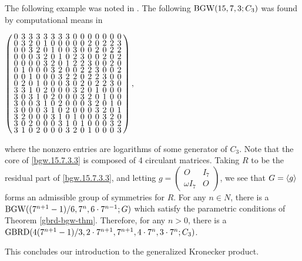 \documentclass[../../../main]{subfiles}
\begin{document}
\begin{ex}
 The following example was noted in \cite{pender_2020}. The following $\text{BGW}(15,7,3;C_3)$ was found by computational means in \cite{mathon-signings}
 \begin{defenum}
  \item\label{bgw.15.7.3.3} $
  \arraycolsep=2.0pt\def\arraystretch{0.5}
  \left(\begin{array}{ccccccccccccccc}
0&3&3&3&3&3&3&3&0&0&0&0&0&0&0\\
0&3&2&0&1&0&0&0&0&0&2&0&2&2&3\\
0&0&3&2&0&1&0&0&3&0&0&2&0&2&2\\
0&0&0&3&2&0&1&0&2&3&0&0&2&0&2\\
0&0&0&0&3&2&0&1&2&2&3&0&0&2&0\\
0&1&0&0&0&3&2&0&0&2&2&3&0&0&2\\
0&0&1&0&0&0&3&2&2&0&2&2&3&0&0\\
0&2&0&1&0&0&0&3&0&2&0&2&2&3&0\\
3&3&1&0&2&0&0&0&3&2&0&1&0&0&0\\
3&0&3&1&0&2&0&0&0&3&2&0&1&0&0\\
3&0&0&3&1&0&2&0&0&0&3&2&0&1&0\\
3&0&0&0&3&1&0&2&0&0&0&3&2&0&1\\
3&2&0&0&0&3&1&0&1&0&0&0&3&2&0\\
3&0&2&0&0&0&3&1&0&1&0&0&0&3&2\\
3&1&0&2&0&0&0&3&2&0&1&0&0&0&3\\
  \end{array}\right),
   $
 \end{defenum}
 where the nonzero entries are logarithms of some generator of $C_3$. Note that the core of \ref{bgw.15.7.3.3} is composed of 4 circulant matrices. Taking $R$ to be the residual part of \ref{bgw.15.7.3.3}, and letting $g=\left(\begin{smallmatrix} O & I_7 \\ \omega I_7 & O \end{smallmatrix}\right)$, we see that $G=\langle g\rangle$ forms an admissible group of symmetries for $R$. For any $n \in N$, there is a $\text{BGW}((7^{n+1}-1)/6,7^n,6 \cdot 7^{n-1};G)$ which satisfy the parametric conditions of Theorem \ref{gbrd-bgw-thm}. Therefore, for any $n>0$, there is a $\text{GBRD}(4(7^{n+1}-1)/3,2\cdot 7^{n+1},7^{n+1},4 \cdot 7^n,3\cdot 7^n; C_3)$.
\end{ex}

This concludes our introduction to the generalized Kronecker product.
 
\biblio
\end{document}
